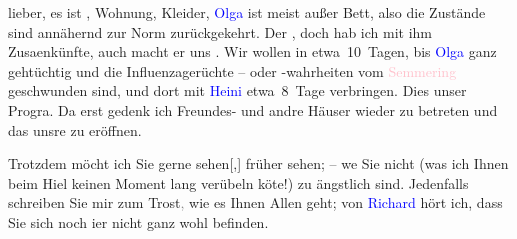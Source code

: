 \pstart
           lieber, es ist \label{K_L03011-1v}\label{K_L03011-1h}, Wohnung, Kleider, \textcolor{blue}{Olga}{}\ledrightnote{\textcolor{blue}{Olga Schnitzler}} ist meist außer
               Bett, also die Zustände sind annähernd zur Norm zurückgekehrt. Der \label{K_L03011-2v}\label{K_L03011-2h}, doch hab ich mit ihm Zusa{\geminationm}enkünfte, auch macht er uns \label{K_L03011-3v}\label{K_L03011-3h}. Wir wollen
               in etwa 10 Tagen, bis \textcolor{blue}{Olga}{}\ledrightnote{\textcolor{blue}{Olga Schnitzler}} ganz gehtüchtig und
               die Influenzagerüchte – oder -wahrheiten vom \textcolor{pink}{Semmering}{}\ledrightnote{\textcolor{pink}{Semmering}} geschwunden sind, \label{K_L03011-4v}\label{K_L03011-4h} und dort mit \textcolor{blue}{Heini}{}\ledrightnote{\textcolor{blue}{Heinrich Schnitzler}} etwa 8 Tage verbringen. Dies unser Progra{\geminationm}. Da{\geminationn} erst gedenk ich
               Freundes- und andre Häuser wieder zu betreten und das {\pb}unsre zu eröffnen.\pend
           
\pstart
           Trotzdem möcht ich Sie gerne sehen{[},{]} früher sehen; – we{\geminationn} Sie nicht (was ich Ihnen beim Hi{\geminationm}el keinen Moment lang verübeln kö{\geminationn}te!) zu ängstlich sind. Jedenfalls schreiben Sie mir
               zum Trost\textcolor{gray}{,} wie es Ihnen Allen geht; von \textcolor{blue}{Richard}{}\ledrightnote{\textcolor{blue}{Richard Beer-Hofmann}} hört ich, dass Sie sich noch i{\geminationm}er nicht ganz wohl befinden.\pend
           
